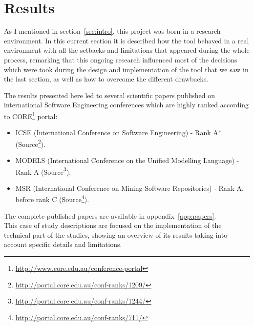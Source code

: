 \documentclass[a4paper, 12pt]{book}
\begin{document}
\chapter{Results}
\label{sec:results}
As I mentioned in section~\ref{sec:intro}, this project was born in a research environment.
In this current section it is described how the tool behaved in a real environment with all the setbacks
and limitations that appeared during the whole process, remarking that this ongoing research
influenced most of the decisions which were took during the design and implementation
of the tool that we saw in the last section, as well as how to overcome the different drawbacks.\par
The results presented here led to several scientific papers published on international Software Engineering
conferences which are highly ranked according to CORE\footnote{\url{http://www.core.edu.au/conference-portal}} portal:
\begin{itemize}
    \item ICSE (International Conference on Software Engineering) - Rank A* (Source\footnote{\url{http://portal.core.edu.au/conf-ranks/1209/}}).
    \item MODELS (International Conference on the Unified Modelling Language) - Rank A (Source\footnote{\url{http://portal.core.edu.au/conf-ranks/1244/}}).
    \item MSR (International Conference on Mining Software Repositories) - Rank A, before rank C (Source\footnote{\url{http://portal.core.edu.au/conf-ranks/711/}}).
\end{itemize}
The complete published papers are available in appendix~\ref{app:papers}.
\\This case of study descriptions are focused on the implementation of the technical part of the studies,
showing an overview of its results taking into account specific details and limitations.
\end{document}

